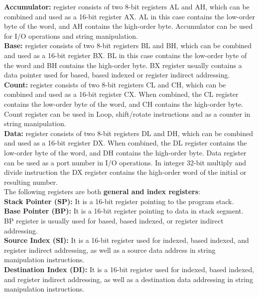 \documentclass[12pt, a4paper]{scrartcl}
\begin{document}
	\textbf{Accumulator: }register consists of two 8-bit registers AL and AH, which can be combined and used as a 16-bit register AX. AL in this case contains the low-order byte
	of the word, and AH contains the high-order byte.
	Accumulator can be used for I/O operations and string
	manipulation. \\

	\textbf{Base: }register consists of two 8-bit registers BL and BH,
	which can be combined and used as a 16-bit
	register BX. BL in this case contains the low-order byte of
	the word and BH contains the high-order byte. BX register
	usually contains a data pointer used for based, based
	indexed or register indirect addressing. \\

	\textbf{Count: }register consists of two 8-bit registers CL and CH,
	which can be combined and used as a 16-bit
	register CX. When combined, the CL register contains the
	low-order byte of the word, and CH contains the high-order byte. Count register can be used in Loop, shift/rotate
	instructions and as a counter in string manipulation. \\

	\textbf{Data: }register consists of two 8-bit registers DL and DH,	which can be combined and used as a 16-bit
	register DX. When combined, the DL register contains the
	low-order byte of the word, and DH contains the high-order byte. Data register can be used as a port number in
	I/O operations. In integer 32-bit multiply and divide
	instruction the DX register contains the high-order word of the
	initial or resulting number. \\

	The following registers are both \textbf{general and index registers}:\\

	\textbf{Stack Pointer (SP): }It is a 16-bit register pointing to the program stack. \\

	\textbf{Base Pointer (BP): }It is a 16-bit register pointing to data in stack segment. BP register is usually used for based, based indexed, or register indirect addressing. \\

	\textbf{Source Index (SI): }It is a 16-bit register used for indexed, based indexed, and register indirect addressing, as well as a source data address in string manipulation instructions.\\

	\textbf{Destination Index (DI): }It is a 16-bit register used for indexed, based indexed, and register indirect addressing, as well as a destination data addressing in string manipulation instructions.\\
\end{document}
